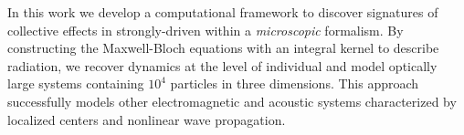
In this work we develop a computational framework to discover signatures of collective effects in strongly-driven \qds{} within a {\it microscopic} formalism.
By constructing the Maxwell-Bloch equations with an integral kernel to describe radiation, we recover dynamics at the level of individual \qds{} and model optically large systems containing $10^4$ particles in three dimensions.
This approach successfully models other electromagnetic \cite{otherpapersfromshanker} and acoustic \cite{Glosser2016} systems characterized by localized centers and nonlinear wave propagation.

